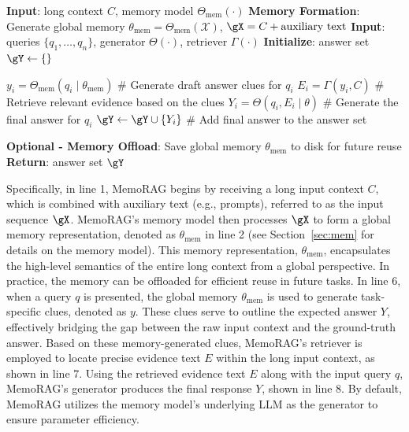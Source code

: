 \documentclass[sigconf]{acmart}
\begin{document}
\begin{algorithm}[t]
\caption{MemoRAG Framework}
\small
\begin{algorithmic}[1]
\STATE \textbf{Input}: long context $C$, memory model $\Theta_{\text{mem}}(\cdot)$ 
\STATE \textbf{Memory Formation}: Generate global memory $\theta_{\text{mem}} = \Theta_{\text{mem}}(\mathcal{X})$, $\gX=C+\text{auxiliary text}$
\STATE \textbf{Input}: queries $\{q_1, \dots, q_n\}$, generator $\Theta(\cdot)$, retriever $\Gamma(\cdot)$
\STATE \textbf{Initialize}: answer set $\gY \leftarrow \{\}$

    \STATE $y_i = \Theta_{\text{mem}}(q_i \mid \theta_{\text{mem}})$ \# Generate draft answer clues for $q_i$
    \STATE $E_i = \Gamma(y_i,C)$ \# Retrieve relevant evidence based on the clues
    \STATE $Y_i = \Theta(q_i, E_i \mid \theta)$ \# Generate the final answer for $q_i$
    \STATE $\gY \leftarrow \gY \cup \{Y_i\}$ \# Add final answer to the answer set
\ENDFOR

\STATE \textbf{Optional - Memory Offload}: Save global memory $\theta_{\text{mem}}$ to disk for future reuse
\STATE \textbf{Return}: answer set $\gY$
\end{algorithmic}
\label{alg:MemoRAG}
\end{algorithm}

Specifically, in \colorbox{gray!20}{line 1}, MemoRAG begins by receiving a long input context $C$, which is combined with auxiliary text (e.g., prompts), referred to as the input sequence $\gX$. MemoRAG's memory model then processes $\gX$ to form a global memory representation, denoted as $\theta_{\text{mem}}$ in \colorbox{gray!20}{line 2} (see Section~\ref{sec:mem} for details on the memory model). This memory representation, $\theta_{\text{mem}}$, encapsulates the high-level semantics of the entire long context from a global perspective. In practice, the memory can be offloaded for efficient reuse in future tasks.
In \colorbox{gray!20}{line 6}, when a query $q$ is presented, the global memory $\theta_{\text{mem}}$ is used to generate task-specific clues, denoted as $y$. These clues serve to outline the expected answer $Y$, effectively bridging the gap between the raw input context and the ground-truth answer. Based on these memory-generated clues, MemoRAG’s retriever is employed to locate precise evidence text $E$ within the long input context, as shown in \colorbox{gray!20}{line 7}.
Using the retrieved evidence text $E$ along with the input query $q$, MemoRAG’s generator produces the final response $Y$, shown in \colorbox{gray!20}{line 8}. By default, MemoRAG utilizes the memory model's underlying LLM as the generator to ensure parameter efficiency.
\end{document}

